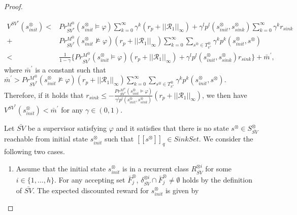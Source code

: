 \documentclass[10pt]{article}
\theoremstyle{definition}
\newcommand{\myspq}{\ensuremath{[\![s^{\otimes}]\!]}_q}
\begin{document}
\begin{proof}
\begin{enumerate}
  \begin{align}
    V^{SV^{\ast}}(s^{\otimes}_{init}) < & Pr^{M^{\otimes}}_{SV^{\ast}}(s^{\otimes}_{init} \models \varphi) \sum_{k=0}^{\infty} \gamma^k (r_p + ||\mathcal{R}_1||_{\infty}) + \gamma^l p^l(s^{\otimes}_{init}, s^{\otimes}_{sink}) \sum_{k=0}^{\infty} \gamma^k r_{sink} \nonumber \\
    + & Pr^{M^{\otimes}}_{SV^{\ast}}(s^{\otimes}_{init} \not\models \varphi) (r_p + ||\mathcal{R}_1||_{\infty}) \sum_{k=0}^{\infty} \sum_{s^{\otimes} \in T^{\otimes}_{\pi^{\ast}}} \gamma^k p^k(s^{\otimes}_{init}, s^{\otimes}) \nonumber \\
    < & \frac{1}{1-\gamma} \{ Pr^{M^{\otimes}}_{SV^{\ast}}(s^{\otimes}_{init} \models \varphi) (r_p + ||\mathcal{R}_1||_{\infty}) + \gamma^l p^l (s^{\otimes}_{init}, s^{\otimes}_{sink}) r_{sink} \} + \bar{m}^{\prime}, \nonumber
  \end{align}
  where $\bar{m}^{\prime}$ is a constant such that $\bar{m}^{\prime} > Pr^{M^{\otimes}}_{SV^{\ast}}(s^{\otimes}_{init} \not\models \varphi) (r_p + ||\mathcal{R}_1||_{\infty}) \sum_{k=0}^{\infty} \sum_{s^{\otimes} \in T^{\otimes}_{\pi^{\ast}}} \gamma^k p^k(s^{\otimes}_{init}, s^{\otimes})$.
  Therefore, if it holds that $r_{sink} \leq - \frac{Pr^{M^{\otimes}}_{SV^{\ast}}(s^{\otimes}_{init} \models \varphi)}{ \gamma^l p^l (s^{\otimes}_{init}, s^{\otimes}_{sink})} (r_p + ||\mathcal{R}_1||_{\infty})$, we then have $V^{SV^{\ast}}(s^{\otimes}_{init}) < \bar{m}^{\prime}$ for any $\gamma \in (0,1)$.

\end{enumerate}
  Let $\bar{SV}$ be a supervisor satisfying $\varphi$ and it satisfies that there is no state $s^{\otimes} \in S^{\otimes}_{\bar{SV}}$ reachable from initial state $s^{\otimes}_{init}$ such that $\myspq \in SinkSet$. We consider the following two cases.

  \begin{enumerate}
    \vspace{2mm}
    \item Assume that the initial state $s^{\otimes}_{init}$ is in a recurrent class $R^{\otimes i}_{\bar{SV}}$ for some $ i \in \{ 1,\ldots,h \} $.
    For any accepting set $\bar{F}^{\otimes}_j$, $\delta^{\otimes i}_{\bar{SV}} \cap \bar{F}^{\otimes}_j \neq \emptyset$ holds by the definition of $\bar{SV}$. The expected discounted reward for $s^{\otimes}_{init}$ is given by


\end{enumerate}
\end{proof}
\end{document}
